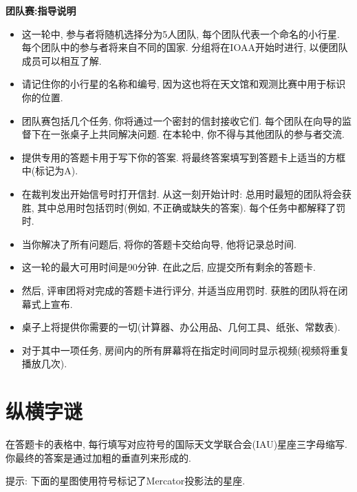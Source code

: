 \documentclass[a4paper,fontset=fandol]{ctexart}
\begin{document}
	{
	\Large\bfseries\noindent 团队赛:\hspace{0.5em}指导说明
	}
	
	\begin{itemize}
		\item 这一轮中, 参与者将随机选择分为5人团队, 每个团队代表一个命名的小行星. 每个团队中的参与者将来自不同的国家. 分组将在IOAA开始时进行, 以便团队成员可以相互了解. 
		
		\item 请记住你的小行星的名称和编号, 因为这也将在天文馆和观测比赛中用于标识你的位置. 
		
		\item 团队赛包括几个任务, 你将通过一个密封的信封接收它们. 每个团队在向导的监督下在一张桌子上共同解决问题. 在本轮中, 你不得与其他团队的参与者交流. 
		
		\item 提供专用的答题卡用于写下你的答案. 将最终答案填写到答题卡上适当的方框中(标记为A). 
		
		\item 在裁判发出开始信号时打开信封. 从这一刻开始计时: 总用时最短的团队将会获胜, 其中总用时包括罚时(例如, 不正确或缺失的答案). 每个任务中都解释了罚时. 
		
		\item 当你解决了所有问题后, 将你的答题卡交给向导, 他将记录总时间. 
		
		\item 这一轮的最大可用时间是90分钟. 在此之后, 应提交所有剩余的答题卡. 
		
		\item 然后, 评审团将对完成的答题卡进行评分, 并适当应用罚时. 获胜的团队将在闭幕式上宣布. 
		
		\item 桌子上将提供你需要的一切(计算器、办公用品、几何工具、纸张、常数表). 
		
		\item 对于其中一项任务, 房间内的所有屏幕将在指定时间同时显示视频(视频将重复播放几次). 
	\end{itemize}
	
	\newpage
	\section{纵横字谜}
	
	在答题卡的表格中, 每行填写对应符号的国际天文学联合会(IAU)星座三字母缩写. 你最终的答案是通过加粗的垂直列来形成的. 
	
	提示: 下面的星图使用符号标记了Mercator投影法的星座. 
	
\end{document}
